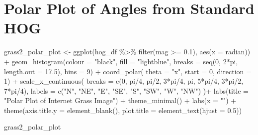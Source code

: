 \documentclass[
  letterpaper,
  DIV=11,
  numbers=noendperiod]{scrreprt}
\newenvironment{Shaded}{\begin{snugshade}}{\end{snugshade}}
\newcommand{\AttributeTok}[1]{\textcolor[rgb]{0.40,0.45,0.13}{#1}}
\newcommand{\DecValTok}[1]{\textcolor[rgb]{0.68,0.00,0.00}{#1}}
\newcommand{\FloatTok}[1]{\textcolor[rgb]{0.68,0.00,0.00}{#1}}
\newcommand{\FunctionTok}[1]{\textcolor[rgb]{0.28,0.35,0.67}{#1}}
\newcommand{\NormalTok}[1]{\textcolor[rgb]{0.00,0.23,0.31}{#1}}
\newcommand{\OtherTok}[1]{\textcolor[rgb]{0.00,0.23,0.31}{#1}}
\newcommand{\SpecialCharTok}[1]{\textcolor[rgb]{0.37,0.37,0.37}{#1}}
\newcommand{\StringTok}[1]{\textcolor[rgb]{0.13,0.47,0.30}{#1}}
\begin{document}
\hypertarget{polar-plot-of-angles-from-standard-hog}{%
\section{Polar Plot of Angles from Standard
HOG}\label{polar-plot-of-angles-from-standard-hog}}

\begin{Shaded}
\begin{Highlighting}[]
\NormalTok{grass2\_polar\_plot }\OtherTok{\textless{}{-}}
\FunctionTok{ggplot}\NormalTok{(hog\_df }\SpecialCharTok{\%\textgreater{}\%} \FunctionTok{filter}\NormalTok{(mag }\SpecialCharTok{\textgreater{}=} \FloatTok{0.1}\NormalTok{), }
       \FunctionTok{aes}\NormalTok{(}\AttributeTok{x =}\NormalTok{ radian)) }\SpecialCharTok{+}
  \FunctionTok{geom\_histogram}\NormalTok{(}\AttributeTok{colour =} \StringTok{"black"}\NormalTok{, }\AttributeTok{fill =} \StringTok{"lightblue"}\NormalTok{, }
                 \AttributeTok{breaks =} \FunctionTok{seq}\NormalTok{(}\DecValTok{0}\NormalTok{, }\DecValTok{2}\SpecialCharTok{*}\NormalTok{pi, }\AttributeTok{length.out =} \FloatTok{17.5}\NormalTok{),}
                 \AttributeTok{bins =} \DecValTok{9}\NormalTok{) }\SpecialCharTok{+}
  \FunctionTok{coord\_polar}\NormalTok{(}
    \AttributeTok{theta =} \StringTok{"x"}\NormalTok{, }\AttributeTok{start =} \DecValTok{0}\NormalTok{, }\AttributeTok{direction =} \DecValTok{1}\NormalTok{) }\SpecialCharTok{+}
  \FunctionTok{scale\_x\_continuous}\NormalTok{(}
    \AttributeTok{breaks =} \FunctionTok{c}\NormalTok{(}\DecValTok{0}\NormalTok{, pi}\SpecialCharTok{/}\DecValTok{4}\NormalTok{, pi}\SpecialCharTok{/}\DecValTok{2}\NormalTok{, }\DecValTok{3}\SpecialCharTok{*}\NormalTok{pi}\SpecialCharTok{/}\DecValTok{4}\NormalTok{, pi, }\DecValTok{5}\SpecialCharTok{*}\NormalTok{pi}\SpecialCharTok{/}\DecValTok{4}\NormalTok{, }\DecValTok{3}\SpecialCharTok{*}\NormalTok{pi}\SpecialCharTok{/}\DecValTok{2}\NormalTok{, }\DecValTok{7}\SpecialCharTok{*}\NormalTok{pi}\SpecialCharTok{/}\DecValTok{4}\NormalTok{), }
    \AttributeTok{labels =} \FunctionTok{c}\NormalTok{(}\StringTok{"N"}\NormalTok{, }\StringTok{"NE"}\NormalTok{, }\StringTok{"E"}\NormalTok{, }\StringTok{"SE"}\NormalTok{, }\StringTok{"S"}\NormalTok{, }\StringTok{"SW"}\NormalTok{, }\StringTok{"W"}\NormalTok{, }\StringTok{"NW"}\NormalTok{)}
\NormalTok{  )}\SpecialCharTok{+}
  \FunctionTok{labs}\NormalTok{(}\AttributeTok{title =} \StringTok{"Polar Plot of Internet Grass Image"}\NormalTok{) }\SpecialCharTok{+}
    \FunctionTok{theme\_minimal}\NormalTok{() }\SpecialCharTok{+}
  \FunctionTok{labs}\NormalTok{(}\AttributeTok{x =} \StringTok{""}\NormalTok{) }\SpecialCharTok{+}
  \FunctionTok{theme}\NormalTok{(}\AttributeTok{axis.title.y =} \FunctionTok{element\_blank}\NormalTok{(),}
        \AttributeTok{plot.title =} \FunctionTok{element\_text}\NormalTok{(}\AttributeTok{hjust =} \FloatTok{0.5}\NormalTok{))}

\NormalTok{grass2\_polar\_plot}
\end{Highlighting}
\end{Shaded}
\end{document}
